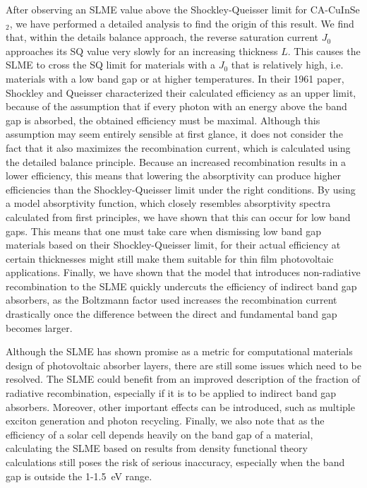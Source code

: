 \begin{refsection}
After observing an SLME value above the Shockley-Queisser limit for 
\mbox{CA-CuInSe$_2$}, we have performed a detailed analysis to find the origin 
of this result. We find that, within the details balance approach, the reverse 
saturation current $J_0$ approaches its SQ value very slowly for an increasing 
thickness $L$. This causes the SLME to cross the SQ limit for materials with a 
$J_0$ that is relatively high, i.e. materials with a low band gap or at higher 
temperatures. In their 1961 paper, Shockley and Queisser characterized their 
calculated efficiency as an upper limit, because of the assumption that if 
every photon with an energy above the band gap is absorbed, the obtained 
efficiency must be maximal. Although this assumption may seem entirely 
sensible at first glance, it does not consider the fact that it also maximizes 
the recombination current, which is calculated using the detailed balance 
principle. Because an increased recombination results in a lower efficiency, 
this means that lowering the absorptivity can produce higher efficiencies than 
the Shockley-Queisser limit under the right conditions. By using a model 
absorptivity function, which closely resembles absorptivity spectra calculated 
from first principles, we have shown that this can occur for low band gaps. 
This means that one must take care when dismissing low band gap materials 
based on their Shockley-Queisser limit, for their actual efficiency at certain 
thicknesses might still make them suitable for thin film photovoltaic 
applications. Finally, we have shown that the model that introduces non-radiative 
recombination to the SLME quickly undercuts the efficiency of indirect band 
gap absorbers, as the Boltzmann factor used increases the recombination 
current drastically once the difference between the direct and fundamental 
band gap becomes larger. 

Although the SLME has shown promise as a metric for computational materials design 
of photovoltaic absorber layers, there are still some issues which need to be 
resolved. The SLME could benefit from an improved description of the fraction of 
radiative recombination, especially if it is to be applied to indirect band gap absorbers. 
Moreover, other important effects can be introduced, such as multiple exciton 
generation and photon recycling. Finally, we also note that as the efficiency of 
a solar cell depends heavily on the band gap of a material, calculating the SLME 
based on results from density functional theory calculations still poses the risk 
of serious inaccuracy, especially when the band gap is outside the 1-1.5~\si{\electronvolt} range.

\printbibliography 
\end{refsection} 
